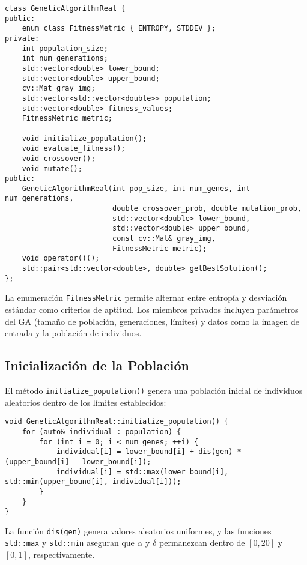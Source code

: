 \begin{lstlisting}[style=cppstyle, caption={Definición de la clase en genetic_algo_img.h}, label={lst:ga_header}]
class GeneticAlgorithmReal {
public:
    enum class FitnessMetric { ENTROPY, STDDEV };
private:
    int population_size;
    int num_generations;
    std::vector<double> lower_bound;
    std::vector<double> upper_bound;
    cv::Mat gray_img;
    std::vector<std::vector<double>> population;
    std::vector<double> fitness_values;
    FitnessMetric metric;

    void initialize_population();
    void evaluate_fitness();
    void crossover();
    void mutate();
public:
    GeneticAlgorithmReal(int pop_size, int num_genes, int num_generations,
                         double crossover_prob, double mutation_prob,
                         std::vector<double> lower_bound,
                         std::vector<double> upper_bound,
                         const cv::Mat& gray_img,
                         FitnessMetric metric);
    void operator()();
    std::pair<std::vector<double>, double> getBestSolution();
};
\end{lstlisting}

La enumeración \texttt{FitnessMetric} permite alternar entre entropía y desviación estándar como criterios de aptitud. Los miembros privados incluyen parámetros del GA (tamaño de población, generaciones, límites) y datos como la imagen de entrada y la población de individuos.

\subsection{Inicialización de la Población}
\label{subsec:inicializacion}

El método \texttt{initialize_population()} genera una población inicial de individuos aleatorios dentro de los límites establecidos:

\begin{lstlisting}[style=cppstyle, caption={Inicialización de la población}, label={lst:init_pop}]
void GeneticAlgorithmReal::initialize_population() {
    for (auto& individual : population) {
        for (int i = 0; i < num_genes; ++i) {
            individual[i] = lower_bound[i] + dis(gen) * (upper_bound[i] - lower_bound[i]);
            individual[i] = std::max(lower_bound[i], std::min(upper_bound[i], individual[i]));
        }
    }
}
\end{lstlisting}

La función \texttt{dis(gen)} genera valores aleatorios uniformes, y las funciones \texttt{std::max} y \texttt{std::min} aseguran que \(\alpha\) y \(\delta\) permanezcan dentro de \([0, 20]\) y \([0, 1]\), respectivamente.

